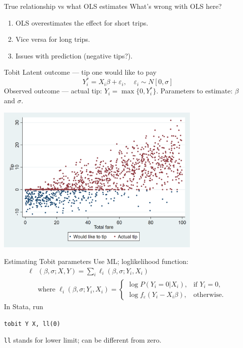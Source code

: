 \documentclass[pdftex]{beamer}
\begin{document}
\begin{frame}{True relationship vs what OLS estimates}
What's wrong with OLS here?
\begin{enumerate}
	\item OLS overestimates the effect for short trips.
	\item Vice versa for long trips.
	\item Issues with prediction (negative tips?).
\end{enumerate}
\end{frame}

\begin{frame}{Tobit}
Latent outcome --- tip one would like to pay
\begin{equation*}
	Y_i^* = X_i\beta + \varepsilon_i,\quad \varepsilon_i\sim{}N[0,\sigma]
\end{equation*}
Observed outcome --- actual tip: $Y_i = \max\{0, Y_i^*\}$. Parameters to estimate: $\beta$ and $\sigma$.
\begin{center}
	\includegraphics[width=0.75\textwidth]{graphs/tobit_latent_vs_actual.png}
\end{center}
\end{frame}

\begin{frame}{Estimating Tobit parameters}
Use ML; loglikelihood function:
\begin{align*}
	\ell&(\beta, \sigma; X, Y) = \sum_i\ell_i(\beta, \sigma; Y_i, X_i)\\
	&\text{where } \ell_i(\beta, \sigma; Y_i, X_i) = 
		\left\{
			\begin{array}{ll}
				\log{}P(Y_i=0|X_i), &\text{if $Y_i=0$,}\\
				\log{}f_\varepsilon(Y_i-X_i\beta), &\text{otherwise.}
			\end{array}
		\right.
\end{align*}
In Stata, run 
\begin{center}
	\texttt{tobit Y X, ll(0)}
\end{center}
\texttt{ll} stands for lower limit; can be different from zero.
\end{frame}
\end{document}

